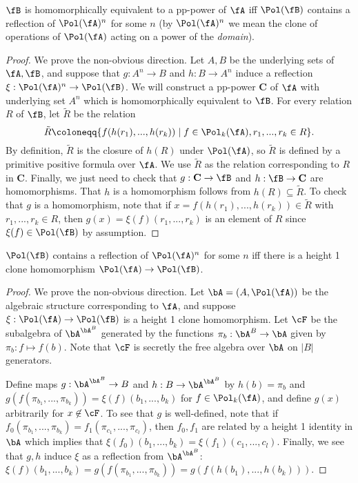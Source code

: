 \begin{prop}\label{erp-prop} $\fB$ is homomorphically equivalent to a pp-power of $\fA$ iff $\Pol(\fB)$ contains a reflection of $\Pol(\fA)^n$ for some $n$ (by $\Pol(\fA)^n$ we mean the clone of operations of $\Pol(\fA)$ acting on a power of the \emph{domain}).
\end{prop}
\begin{proof} We prove the non-obvious direction. Let $A,B$ be the underlying sets of $\fA, \fB$, and suppose that $g: A^n \rightarrow B$ and $h: B \rightarrow A^n$ induce a reflection $\xi : \Pol(\fA)^n \rightarrow \Pol(\fB)$. We will construct a pp-power $\mathbf{C}$ of $\fA$ with underlying set $A^n$ which is homomorphically equivalent to $\fB$. For every relation $R$ of $\fB$, let $\tilde{R}$ be the relation
\[
\tilde{R} \coloneqq \{f(h(r_1), ..., h(r_k)) \mid f \in \Pol_k(\fA), r_1, ..., r_k \in R\}.
\]
By definition, $\tilde{R}$ is the closure of $h(R)$ under $\Pol(\fA)$, so $\tilde{R}$ is defined by a primitive positive formula over $\fA$. We use $\tilde{R}$ as the relation corresponding to $R$ in $\mathbf{C}$. Finally, we just need to check that $g : \mathbf{C} \rightarrow \fB$ and $h : \fB \rightarrow \mathbf{C}$ are homomorphisms. That $h$ is a homomorphism follows from $h(R) \subseteq \tilde{R}$. To check that $g$ is a homomorphism, note that if $x = f(h(r_1), ..., h(r_k)) \in \tilde{R}$ with $r_1, ..., r_k \in R$, then $g(x) = \xi(f)(r_1, ..., r_k)$ is an element of $R$ since $\xi(f) \in \Pol(\fB)$ by assumption.
\end{proof}

\begin{thm}\label{erp-thm} $\Pol(\fB)$ contains a reflection of $\Pol(\fA)^n$ for some $n$ iff there is a height 1 clone homomorphism $\Pol(\fA) \rightarrow \Pol(\fB)$.
\end{thm}
\begin{proof} We prove the non-obvious direction. Let $\bA = (A,\Pol(\fA))$ be the algebraic structure corresponding to $\fA$, and suppose $\xi : \Pol(\fA) \rightarrow \Pol(\fB)$ is a height 1 clone homomorphism. Let $\cF$ be the subalgebra of $\bA^{\bA^B}$ generated by the functions $\pi_b : \bA^B \rightarrow \bA$ given by $\pi_b : f \mapsto f(b)$. Note that $\cF$ is secretly the free algebra over $\bA$ on $|B|$ generators.

Define maps $g : \bA^{\bA^B} \rightarrow B$ and $h : B \rightarrow \bA^{\bA^B}$ by $h(b) = \pi_b$ and $g(f(\pi_{b_1}, ..., \pi_{b_k})) = \xi(f)(b_1, ..., b_k)$ for $f \in \Pol_k(\fA)$, and define $g(x)$ arbitrarily for $x \not\in \cF$. To see that $g$ is well-defined, note that if $f_0(\pi_{b_1}, ..., \pi_{b_k}) = f_1(\pi_{c_1}, ..., \pi_{c_l})$, then $f_0, f_1$ are related by a height 1 identity in $\bA$ which implies that $\xi(f_0)(b_1, ..., b_k) = \xi(f_1)(c_1, ..., c_l)$. Finally, we see that $g,h$ induce $\xi$ as a reflection from $\bA^{\bA^B}$: $\xi(f)(b_1, ..., b_k) = g(f(\pi_{b_1}, ..., \pi_{b_k})) = g(f(h(b_1), ..., h(b_k)))$.
\end{proof}

